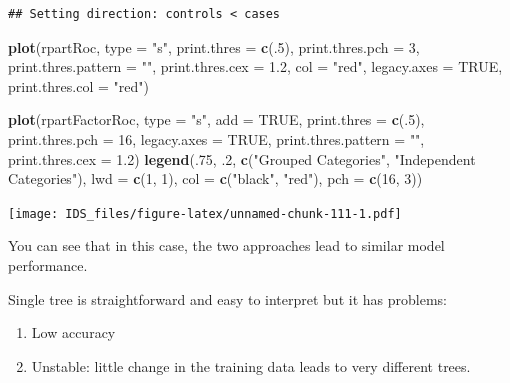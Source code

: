 \documentclass[12pt,]{krantz}
\makeatletter
\newenvironment{Shaded}{\begin{snugshade}}{\end{snugshade}}
\newcommand{\DataTypeTok}[1]{\textcolor[rgb]{0.27,0.27,0.27}{#1}}
\newcommand{\DecValTok}[1]{\textcolor[rgb]{0.06,0.06,0.06}{#1}}
\newcommand{\FloatTok}[1]{\textcolor[rgb]{0.06,0.06,0.06}{#1}}
\newcommand{\KeywordTok}[1]{\textcolor[rgb]{0.27,0.27,0.27}{\textbf{#1}}}
\newcommand{\NormalTok}[1]{#1}
\newcommand{\OtherTok}[1]{\textcolor[rgb]{0.37,0.37,0.37}{#1}}
\newcommand{\StringTok}[1]{\textcolor[rgb]{0.5,0.5,0.5}{#1}}
\providecommand{\tightlist}{%
  \setlength{\itemsep}{0pt}\setlength{\parskip}{0pt}}
\newenvironment{kframe}{%
\medskip{}
\setlength{\fboxsep}{.8em}
 \def\at@end@of@kframe{}%
 \ifinner\ifhmode%
  \def\at@end@of@kframe{\end{minipage}}%
  \begin{minipage}{\columnwidth}%
 \fi\fi%
 \def\FrameCommand##1{\hskip\@totalleftmargin \hskip-\fboxsep
 \colorbox{shadecolor}{##1}\hskip-\fboxsep
     \hskip-\linewidth \hskip-\@totalleftmargin \hskip\columnwidth}%
 \MakeFramed {\advance\hsize-\width
   \@totalleftmargin\z@ \linewidth\hsize
   \@setminipage}}%
 {\par\unskip\endMakeFramed%
 \at@end@of@kframe}
\renewenvironment{Shaded}{\begin{kframe}}{\end{kframe}}
\makeatother
\begin{document}
\begin{verbatim}
## Setting direction: controls < cases
\end{verbatim}

\begin{Shaded}
\begin{Highlighting}[]
\KeywordTok{plot}\NormalTok{(rpartRoc, }\DataTypeTok{type =} \StringTok{"s"}\NormalTok{, }\DataTypeTok{print.thres =} \KeywordTok{c}\NormalTok{(.}\DecValTok{5}\NormalTok{),}
     \DataTypeTok{print.thres.pch =} \DecValTok{3}\NormalTok{,}
     \DataTypeTok{print.thres.pattern =} \StringTok{""}\NormalTok{,}
     \DataTypeTok{print.thres.cex =} \FloatTok{1.2}\NormalTok{,}
     \DataTypeTok{col =} \StringTok{"red"}\NormalTok{, }\DataTypeTok{legacy.axes =} \OtherTok{TRUE}\NormalTok{,}
     \DataTypeTok{print.thres.col =} \StringTok{"red"}\NormalTok{)}

\KeywordTok{plot}\NormalTok{(rpartFactorRoc,}
     \DataTypeTok{type =} \StringTok{"s"}\NormalTok{,}
     \DataTypeTok{add =} \OtherTok{TRUE}\NormalTok{,}
     \DataTypeTok{print.thres =} \KeywordTok{c}\NormalTok{(.}\DecValTok{5}\NormalTok{),}
     \DataTypeTok{print.thres.pch =} \DecValTok{16}\NormalTok{, }\DataTypeTok{legacy.axes =} \OtherTok{TRUE}\NormalTok{,}
     \DataTypeTok{print.thres.pattern =} \StringTok{""}\NormalTok{,}
     \DataTypeTok{print.thres.cex =} \FloatTok{1.2}\NormalTok{)}
\KeywordTok{legend}\NormalTok{(.}\DecValTok{75}\NormalTok{, }\FloatTok{.2}\NormalTok{,}
       \KeywordTok{c}\NormalTok{(}\StringTok{"Grouped Categories"}\NormalTok{, }\StringTok{"Independent Categories"}\NormalTok{),}
       \DataTypeTok{lwd =} \KeywordTok{c}\NormalTok{(}\DecValTok{1}\NormalTok{, }\DecValTok{1}\NormalTok{),}
       \DataTypeTok{col =} \KeywordTok{c}\NormalTok{(}\StringTok{"black"}\NormalTok{, }\StringTok{"red"}\NormalTok{),}
       \DataTypeTok{pch =} \KeywordTok{c}\NormalTok{(}\DecValTok{16}\NormalTok{, }\DecValTok{3}\NormalTok{))}
\end{Highlighting}
\end{Shaded}

\texttt{[image: IDS\_files/figure-latex/unnamed-chunk-111-1.pdf]}

You can see that in this case, the two approaches lead to similar model performance.

Single tree is straightforward and easy to interpret but it has problems:

\begin{enumerate}
\def\labelenumi{\arabic{enumi}.}
\tightlist
\item
  Low accuracy
\item
  Unstable: little change in the training data leads to very different trees.
\end{enumerate}
\end{document}
